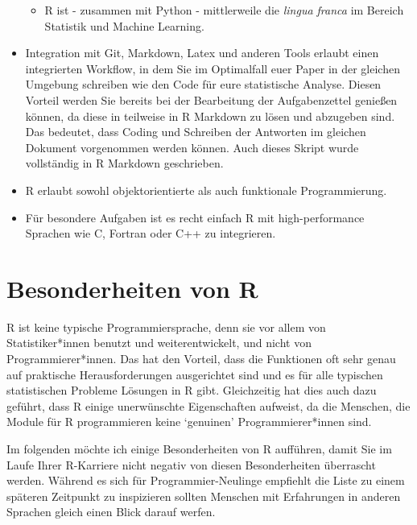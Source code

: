 \documentclass[]{tufte-book}
\providecommand{\tightlist}{%
  \setlength{\itemsep}{0pt}\setlength{\parskip}{0pt}}
\begin{document}
\begin{itemize}
  \begin{itemize}
  \tightlist
  \item
    R ist - zusammen mit Python - mittlerweile die \emph{lingua franca}
    im Bereich Statistik und Machine Learning.
  \end{itemize}
\item
  Integration mit Git, Markdown, Latex und anderen Tools erlaubt einen
  integrierten Workflow, in dem Sie im Optimalfall euer Paper in der
  gleichen Umgebung schreiben wie den Code für eure statistische
  Analyse. Diesen Vorteil werden Sie bereits bei der Bearbeitung der
  Aufgabenzettel genießen können, da diese in teilweise in R Markdown zu
  lösen und abzugeben sind. Das bedeutet, dass Coding und Schreiben der
  Antworten im gleichen Dokument vorgenommen werden können. Auch dieses
  Skript wurde vollständig in R Markdown geschrieben.
\item
  R erlaubt sowohl objektorientierte als auch funktionale
  Programmierung.
\item
  Für besondere Aufgaben ist es recht einfach R mit high-performance
  Sprachen wie C, Fortran oder C++ zu integrieren.
\end{itemize}

\section{Besonderheiten von R}\label{besonderheiten-von-r}

R ist keine typische Programmiersprache, denn sie vor allem von
Statistiker*innen benutzt und weiterentwickelt, und nicht von
Programmierer*innen. Das hat den Vorteil, dass die Funktionen oft sehr
genau auf praktische Herausforderungen ausgerichtet sind und es für alle
typischen statistischen Probleme Lösungen in R gibt. Gleichzeitig hat
dies auch dazu geführt, dass R einige unerwünschte Eigenschaften
aufweist, da die Menschen, die Module für R programmieren keine
`genuinen' Programmierer*innen sind.

Im folgenden möchte ich einige Besonderheiten von R aufführen, damit Sie
im Laufe Ihrer R-Karriere nicht negativ von diesen Besonderheiten
überrascht werden. Während es sich für Programmier-Neulinge empfiehlt
die Liste zu einem späteren Zeitpunkt zu inspizieren sollten Menschen
mit Erfahrungen in anderen Sprachen gleich einen Blick darauf werfen.
\end{document}
